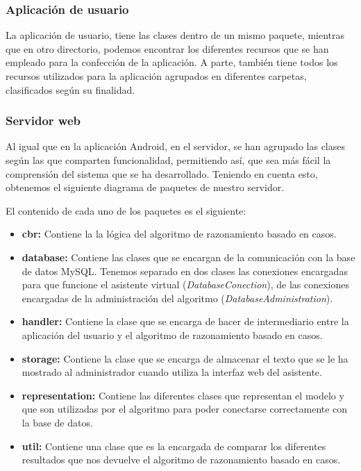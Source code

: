 \subsubsection{Aplicación de usuario}

La aplicación de usuario, tiene las clases dentro de un mismo paquete, mientras que en otro directorio, podemos encontrar los diferentes recursos que se han empleado para la confección de la aplicación. A parte, también tiene todos los recursos utilizados para la aplicación agrupados en diferentes carpetas, clasificados según su finalidad.



\subsubsection{Servidor web}

Al igual que en la aplicación Android, en el servidor, se han agrupado las clases según las que comparten funcionalidad, permitiendo así, que sea más fácil la comprensión del sistema que se ha desarrollado. Teniendo en cuenta esto, obtenemos el siguiente diagrama de paquetes de nuestro servidor.


El contenido de cada uno de los paquetes es el siguiente:

\begin{itemize}
	\tightlist
	\item 
	\textbf{cbr:} Contiene la la lógica del algoritmo de razonamiento basado en casos.
	\item 
	\textbf{database:} Contiene las clases que se encargan de la comunicación con la base de datos MySQL. Tenemos separado en dos clases las conexiones encargadas para que funcione el asistente virtual (\textit{DatabaseConection}), de las conexiones encargadas de la administración del algoritmo (\textit{DatabaseAdministration}).
	\item 
	\textbf{handler:} Contiene la clase que se encarga de hacer de intermediario entre la aplicación del usuario y el algoritmo de razonamiento basado en casos.
	\item 
	\textbf{storage:} Contiene la clase que se encarga de almacenar el texto que se le ha mostrado al administrador cuando utiliza la interfaz web del asistente.
	\item 
	\textbf{representation:} Contiene las diferentes clases que representan el modelo y que son utilizadas por el algoritmo para poder conectarse correctamente con la base de datos.
	\item 
	\textbf{util:} Contiene una clase que es la encargada de comparar los diferentes resultados que nos devuelve el algoritmo de razonamiento basado en casos.
\end{itemize}

